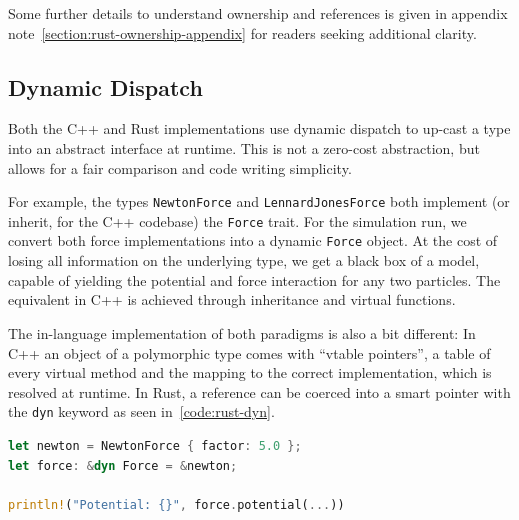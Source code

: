 \documentclass[11pt,
               a4paper,
               bibtotoc,
               idxtotoc,
               headsepline,
               footsepline,
               footexclude,
               BCOR12mm,
               DIV13,
               openany,   %
               ]
               {scrbook}
\begin{document}


Some further details to understand ownership and references is given in appendix note~\ref{section:rust-ownership-appendix} for readers seeking additional clarity.

\subsection{Dynamic Dispatch}

Both the C++ and Rust implementations use dynamic dispatch to up-cast a type into an abstract interface at runtime. This is not a zero-cost abstraction, but allows for a fair comparison and code writing simplicity.

For example, the types \texttt{NewtonForce} and \texttt{LennardJonesForce} both implement (or inherit, for the C++ codebase) the \texttt{Force} trait. For the simulation run, we convert both force implementations into a dynamic \texttt{Force} object. At the cost of losing all information on the underlying type, we get a black box of a model, capable of yielding the potential and force interaction for any two particles. The equivalent in C++ is achieved through inheritance and virtual functions.

The in-language implementation of both paradigms is also a bit different: In C++ an object of a polymorphic type comes with ``vtable pointers'', a table of every virtual method and the mapping to the correct implementation, which is resolved at runtime. In Rust, a reference can be coerced into a smart pointer with the \texttt{dyn} keyword as seen in~\autoref{code:rust-dyn}.

\vspace{0.5em}
\begin{lstlisting}[style=eclipse-rust, language=Rust, basicstyle=\ttfamily\small, caption=Dynamic Coercion in Rust, label=code:rust-dyn]
let newton = NewtonForce { factor: 5.0 };
let force: &dyn Force = &newton;

println!("Potential: {}", force.potential(...))
\end{lstlisting}
\end{document}
